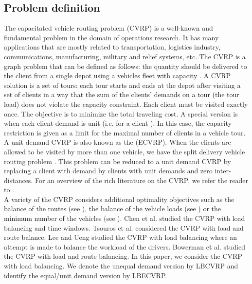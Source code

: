 \subsection{Problem definition}
\indent The capacitated vehicle routing problem (CVRP) is a well-known and fundamental problem in the domain of operations research. It has many applications that are mostly related to transportation, logistics industry, communications, manufacturing, military and relief systems, etc. The CVRP is a graph problem that can be defined as follows: the quantity  should be delivered to the client  from a single depot using a vehicles fleet with capacity . A CVRP solution is a set of tours: each tour starts and ends at the depot after visiting a set of clients in a way that the sum of the clients' demands on a tour (the tour load) does not violate the capacity constraint. Each client must be visited exactly once. The objective is to minimize the total traveling cost. A special version is when each client demand is unit (i.e.  for a client ). In this case, the capacity restriction is given as a limit for the maximal number of clients in a vehicle tour. A unit demand CVRP is also known as the  (ECVRP). When the clients are allowed to be visited by more than one vehicle, we have the split delivery vehicle routing problem \cite{Dror}. This problem can be reduced to a unit demand CVRP by replacing a client  with demand  by  clients with unit demands and zero inter-distances. For an overview of the rich literature on the CVRP, we refer the reader to \cite{Altinkemer1990,Altinkemer1987,Baldacci,Bompadre,Chandran,Frederickson,Haimovich1988,Haimovich1985,Laporte,Li,Marinakis}. \\
\indent  A variety of the CVRP considers additional optimality objectives such as the balance of the routes (see \cite{Zhou}), the balance of the vehicle loads (see \cite{Bowerman}) or the minimum number of the vehicles (see \cite{Bowerman}). Chen et al. \cite{Chen2008} studied the CVRP with load balancing and time windows. Tsouros et al. \cite{Tsouros} considered the CVRP with load and route balance. Lee and Ueng \cite{Lee} studied the CVRP with load balancing where an attempt is made to balance the workload of the drivers. Bowerman et al. \cite{Bowerman} studied the CVRP with load and route balancing. In this paper, we consider the CVRP with load balancing. We denote the unequal demand version by LBCVRP and identify the equal/unit demand version by LBECVRP.\\
